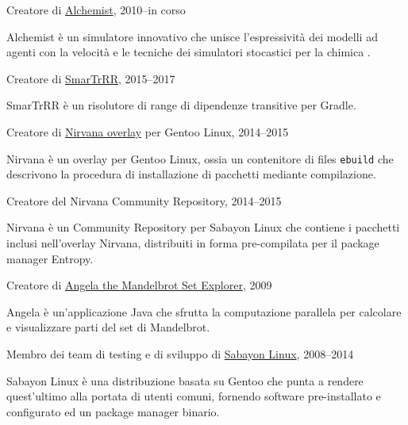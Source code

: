\documentclass[10pt]{article}
\newenvironment{innerlist}[1][\enskip\textbullet]%
        {\begin{compactitem}[#1]}{\end{compactitem}}
\newcommand{\halfblankline}{\quad\vspace{-0.5\baselineskip}\pagebreak[3]}
\begin{document}
Creatore di \href{http://alchemist.apice.unibo.it/}{Alchemist}, 2010--in corso
\begin{innerlist}
    \item Alchemist è un simulatore innovativo che unisce l'espressività dei modelli ad agenti con la velocità e le tecniche dei simulatori stocastici per la chimica \cite{PianiniJOS2013}.
\end{innerlist}
\halfblankline

Creatore di \href{https://github.com/DanySK/SmarTrRR}{SmarTrRR}, 2015--2017
\begin{innerlist}
    \item SmarTrRR è un risolutore di range di dipendenze transitive per Gradle.
\end{innerlist}
\halfblankline

Creatore di \href{https://bitbucket.org/danysk/nirvana-overlay/}{Nirvana overlay} per Gentoo Linux, 2014--2015
\begin{innerlist}
    \item Nirvana è un overlay per Gentoo Linux, ossia un contenitore di files \texttt{ebuild} che descrivono la procedura di installazione di pacchetti mediante compilazione.
\end{innerlist}
\halfblankline

Creatore del {Nirvana Community Repository}, 2014--2015
\begin{innerlist}
    \item Nirvana è un Community Repository per Sabayon Linux che contiene i pacchetti inclusi nell'overlay Nirvana, distribuiti in forma pre-compilata per il package manager Entropy.
\end{innerlist}
\halfblankline

Creatore di \href{https://sourceforge.net/projects/mandelbrot/}{Angela the Mandelbrot Set Explorer}, 2009
\begin{innerlist}
  \item Angela è un'applicazione Java che sfrutta la computazione parallela per calcolare e visualizzare parti del set di Mandelbrot.
\end{innerlist}
\halfblankline

Membro dei team di testing e di sviluppo di \href{http://www.sabayon.org/}{Sabayon Linux}, 2008--2014
\begin{innerlist}
  \item Sabayon Linux è una distribuzione basata su Gentoo che punta a rendere quest'ultimo alla portata di utenti comuni, fornendo software pre-installato e configurato ed un package manager binario.
\end{innerlist}
\halfblankline
\end{document}
